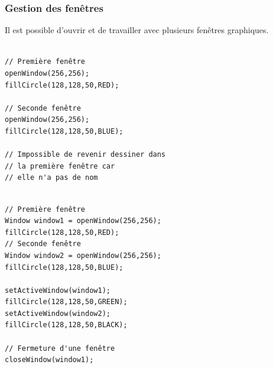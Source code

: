 \begin{frame}[fragile]
\frametitle{Gestion des fenêtres}

Il est possible d'ouvrir et de travailler avec plusieurs fenêtres graphiques.

\begin{minipage}{0.49\linewidth}
\begin{verbatim}

// Première fenêtre
openWindow(256,256);
fillCircle(128,128,50,RED); 

// Seconde fenêtre
openWindow(256,256);
fillCircle(128,128,50,BLUE); 

// Impossible de revenir dessiner dans
// la première fenêtre car
// elle n'a pas de nom

\end{verbatim}
\end{minipage}
\hfill
\begin{minipage}{0.49\linewidth}
\begin{verbatim}

// Première fenêtre
Window window1 = openWindow(256,256);
fillCircle(128,128,50,RED); 
// Seconde fenêtre
Window window2 = openWindow(256,256);
fillCircle(128,128,50,BLUE); 

setActiveWindow(window1);
fillCircle(128,128,50,GREEN); 
setActiveWindow(window2);
fillCircle(128,128,50,BLACK);

// Fermeture d'une fenêtre
closeWindow(window1);

\end{verbatim}
\end{minipage}
\end{frame}

